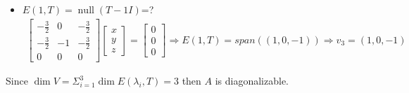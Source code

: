 \documentclass[12pt, letterpaper]{scrartcl}
\DeclareMathOperator{\Null}{null}
\begin{document}
\begin{enumerate}[(a)]
\begin{itemize}
        \item $E(1,T)=\Null(T-1I)$=?
             \begin{align*}
                 \left[
                 \begin{array}{ccc}
                      -\frac{3}{2}&0&-\frac{3}{2}\\
                      -\frac{3}{2}&-1&-\frac{3}{2}\\
                      0&0&0
                 \end{array}
                 \right]
                 \left[
                 \begin{array}{c}
                      x\\
                      y\\
                      z
                 \end{array}
                 \right]
                 =
                 \left[
                 \begin{array}{c}
                      0\\
                      0\\
                      0
                 \end{array}
                 \right]
                 \Longrightarrow
                 E(1,T)=span((1,0,-1))
                 \Longrightarrow
                 v_3=(1,0,-1)
             \end{align*}
     \end{itemize}
     Since $\dim V=\Sigma_{i=1}^3\dim E(\lambda_i,T)=3$ then $A$ is diagonalizable.
     

\end{enumerate}
\end{document}
